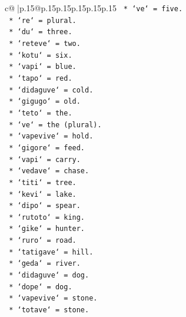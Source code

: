 \documentclass{article}
\begin{document}
{\begin{supertabular}{c@{$\;$}|p{.15\linewidth}@{}p{.15\linewidth}p{.15\linewidth}p{.15\linewidth}p{.15\linewidth}p{.15\linewidth}}
{{{\texttt{                        *   `ve` = five.} \\
\texttt{                        *   `re` = plural.} \\
\texttt{                        *   `du` = three.} \\
\texttt{                        *   `reteve` = two.} \\
\texttt{                        *   `kotu` = six.} \\
\texttt{                        *   `vapi` = blue.} \\
\texttt{                        *   `tapo` = red.} \\
\texttt{                        *   `didaguve` = cold.} \\
\texttt{                        *   `gigugo` = old.} \\
\texttt{                        *   `teto` = the.} \\
\texttt{                        *   `ve` = the (plural).} \\
\texttt{                        *   `vapevive` = hold.} \\
\texttt{                        *   `gigore` = feed.} \\
\texttt{                        *   `vapi` = carry.} \\
\texttt{                        *   `vedave` = chase.} \\
\texttt{                        *   `titi` = tree.} \\
\texttt{                        *   `kevi` = lake.} \\
\texttt{                        *   `dipo` = spear.} \\
\texttt{                        *   `rutoto` = king.} \\
\texttt{                        *   `gike` = hunter.} \\
\texttt{                        *   `ruro` = road.} \\
\texttt{                        *   `tatigave` = hill.} \\
\texttt{                        *   `geda` = river.} \\
\texttt{                        *   `didaguve` = dog.} \\
\texttt{                        *   `dope` = dog.} \\
\texttt{                        *   `vapevive` = stone.} \\
\texttt{                        *   `totave` = stone.} \\
}}}
\end{supertabular}}
\end{document}
